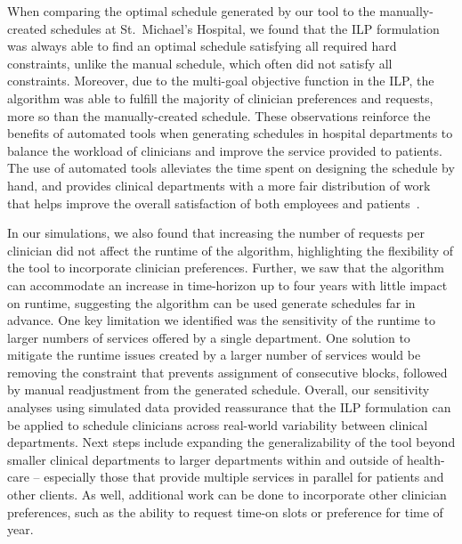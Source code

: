 When comparing the optimal schedule generated by our tool to the
manually-created schedules at St.\ Michael's Hospital, we found that the ILP
formulation was always able to find an optimal schedule satisfying all required
hard constraints, unlike the manual schedule, which often did not satisfy all
constraints. Moreover, due to the multi-goal objective function in
the ILP, the algorithm was able to fulfill the majority of clinician
preferences and requests, more so than the manually-created schedule. These
observations reinforce the benefits of automated tools when generating schedules
in hospital departments to balance the workload of clinicians and improve the
service provided to patients. The use of automated tools alleviates the time
spent on designing the schedule by hand, and provides clinical departments with
a more fair distribution of work that helps improve the overall satisfaction of
both employees and patients~\cite{silvestro_evaluation_2000}.  %

In our simulations, we also found that increasing the number of requests per
clinician did not affect the runtime of the algorithm, highlighting the
flexibility of the tool to incorporate clinician preferences. Further, we saw
that the algorithm can accommodate an increase in time-horizon up to four years
with little impact on runtime, suggesting the algorithm can be used generate
schedules far in advance. One key limitation we identified was the sensitivity
of the runtime to larger numbers of services offered by a single department. 
One solution to mitigate the runtime issues created by a
larger number of services would be removing the constraint that prevents
assignment of consecutive blocks, followed by manual readjustment from the
generated schedule. %
Overall, our sensitivity analyses using simulated data provided reassurance that
the ILP formulation can be applied to schedule clinicians across real-world
variability between clinical departments. %
Next steps include expanding the generalizability of the tool beyond smaller
clinical departments to larger departments within and outside of health-care --
especially those that provide multiple services in parallel for patients and
other clients. As well, additional work can be done to incorporate other
clinician preferences, such as the ability to request time-on slots or preference
for time of year.
